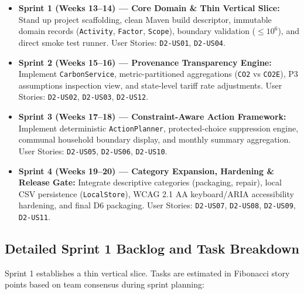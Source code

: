 \documentclass[12pt,a4paper]{article}
\newcommand{\code}[1]{\texttt{#1}}
\begin{document}
\begin{itemize}[leftmargin=*]
  \item \textbf{Sprint 1 (Weeks 13--14) --- Core Domain \& Thin Vertical Slice:} Stand up project scaffolding, clean Maven build descriptor, immutable domain records (\code{Activity}, \code{Factor}, \code{Scope}), boundary validation ($\le 10^6$), and direct smoke test runner. User Stories: \code{D2-US01}, \code{D2-US04}.
  \item \textbf{Sprint 2 (Weeks 15--16) --- Provenance Transparency Engine:} Implement \code{CarbonService}, metric-partitioned aggregations (\code{CO2} vs \code{CO2E}), P3 assumptions inspection view, and state-level tariff rate adjustments. User Stories: \code{D2-US02}, \code{D2-US03}, \code{D2-US12}.
  \item \textbf{Sprint 3 (Weeks 17--18) --- Constraint-Aware Action Framework:} Implement deterministic \code{ActionPlanner}, protected-choice suppression engine, communal household boundary display, and monthly summary aggregation. User Stories: \code{D2-US05}, \code{D2-US06}, \code{D2-US10}.
  \item \textbf{Sprint 4 (Weeks 19--20) --- Category Expansion, Hardening \& Release Gate:} Integrate descriptive categories (packaging, repair), local CSV persistence (\code{LocalStore}), WCAG 2.1 AA keyboard/ARIA accessibility hardening, and final D6 packaging. User Stories: \code{D2-US07}, \code{D2-US08}, \code{D2-US09}, \code{D2-US11}.
\end{itemize}

\subsection{Detailed Sprint 1 Backlog and Task Breakdown}
Sprint 1 establishes a thin vertical slice. Tasks are estimated in Fibonacci story points based on team consensus during sprint planning:
\end{document}
